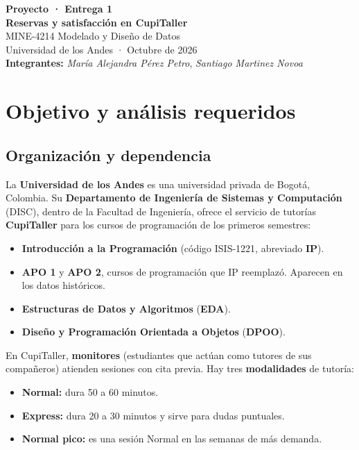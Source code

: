 \documentclass[11pt,letterpaper]{article}
\begin{document}
\begin{center}
{\Large\bfseries Proyecto · Entrega 1\\[2pt] Reservas y satisfacción en CupiTaller}\\[8pt]
MINE-4214 Modelado y Diseño de Datos\\
Universidad de los Andes · Octubre de 2026\\[6pt]
\textbf{Integrantes:} \emph{María Alejandra Pérez Petro}, \emph{Santiago Martinez Novoa}
\end{center}
\tableofcontents
\bigskip


\section{Objetivo y análisis requeridos}

\subsection{Organización y dependencia}

La \textbf{Universidad de los Andes} es una universidad privada de Bogotá, Colombia. Su \textbf{Departamento de Ingeniería de Sistemas y Computación} (DISC), dentro de la Facultad de Ingeniería, ofrece el servicio de tutorías \textbf{CupiTaller} para los cursos de programación de los primeros semestres:

\begin{itemize}[leftmargin=1.5em,itemsep=2pt]
\item \textbf{Introducción a la Programación} (código ISIS-1221, abreviado \textbf{IP}).
\item \textbf{APO 1} y \textbf{APO 2}, cursos de programación que IP reemplazó. Aparecen en los datos históricos.
\item \textbf{Estructuras de Datos y Algoritmos} (\textbf{EDA}).
\item \textbf{Diseño y Programación Orientada a Objetos} (\textbf{DPOO}).
\end{itemize}

En CupiTaller, \textbf{monitores} (estudiantes que actúan como tutores de sus compañeros) atienden sesiones con cita previa. Hay tres \textbf{modalidades} de tutoría:

\begin{itemize}[leftmargin=1.5em,itemsep=2pt]
\item \textbf{Normal:} dura 50 a 60 minutos.
\item \textbf{Express:} dura 20 a 30 minutos y sirve para dudas puntuales.
\item \textbf{Normal pico:} es una sesión Normal en las semanas de más demanda.
\end{itemize}
\end{document}
